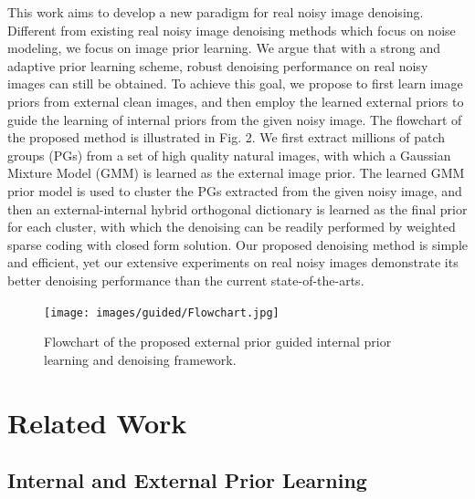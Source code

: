 This work aims to develop a new paradigm for real noisy image denoising. Different from existing real noisy image denoising methods \cite{fullyblind,rabie2005robust,Liu2008,almapg,crosschannel2016,Zhu_2016_CVPR,noiseclinic,ncwebsite}  which focus on noise modeling, we focus on image prior learning. We argue that with a strong and adaptive prior learning scheme, robust denoising performance on real noisy images can still be obtained.  To achieve this goal, we propose to first learn image priors from external clean images, and then employ the learned external priors to guide the learning of internal priors from the given noisy image. The flowchart of the proposed method is illustrated in Fig. 2. We first extract millions of patch groups (PGs) from a set of high quality natural images, with which a Gaussian Mixture Model (GMM) is learned as the external image prior. The learned GMM prior model is used to cluster the PGs extracted from the given noisy image, and then an external-internal hybrid orthogonal dictionary is learned as the final prior for each cluster, with which the denoising can be readily performed by weighted sparse coding with closed form solution. Our proposed denoising method is simple and efficient, yet our extensive experiments on real noisy images demonstrate its better denoising performance than the current state-of-the-arts.


\begin{figure}
\label{fig2}
\centering
\captionsetup{justification=centering,margin=0.1cm}
\texttt{[image: images/guided/Flowchart.jpg]}
\centering
\caption{Flowchart of the proposed external prior guided internal prior learning and denoising framework.}
\end{figure}



\section{Related Work}

\subsection{Internal and External Prior Learning}

